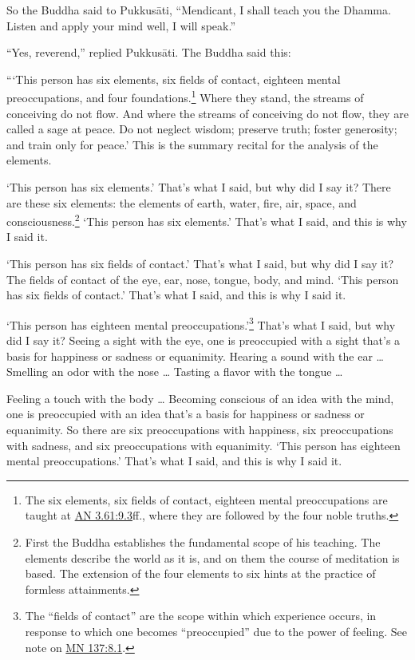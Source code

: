 \documentclass[12pt,openany]{book}%
\begin{document}
So the Buddha said to \textsanskrit{Pukkusāti}, “Mendicant, I shall teach you the Dhamma. Listen and apply your mind well, I will speak.” 

“Yes, reverend,” replied \textsanskrit{Pukkusāti}. The Buddha said this: 

“‘This person has six elements, six fields of contact, eighteen mental preoccupations, and four foundations.\footnote{The six elements, six fields of contact, eighteen mental preoccupations are taught at \href{https://suttacentral.net/an3.61/en/sujato\#9.3}{AN 3.61:9.3}ff., where they are followed by the four noble truths. } Where they stand, the streams of conceiving do not flow. And where the streams of conceiving do not flow, they are called a sage at peace. Do not neglect wisdom; preserve truth; foster generosity; and train only for peace.’ This is the summary recital for the analysis of the elements. 

‘This person has six elements.’ That’s what I said, but why did I say it? There are these six elements: the elements of earth, water, fire, air, space, and consciousness.\footnote{First the Buddha establishes the fundamental scope of his teaching. The elements describe the world as it is, and on them the course of meditation is based. The extension of the four elements to six hints at the practice of formless attainments. } ‘This person has six elements.’ That’s what I said, and this is why I said it. 

‘This person has six fields of contact.’ That’s what I said, but why did I say it? The fields of contact of the eye, ear, nose, tongue, body, and mind. ‘This person has six fields of contact.’ That’s what I said, and this is why I said it. 

‘This person has eighteen mental preoccupations.’\footnote{The “fields of contact” are the scope within which experience occurs, in response to which one becomes “preoccupied” due to the power of feeling. See note on \href{https://suttacentral.net/mn137/en/sujato\#8.1}{MN 137:8.1}. } That’s what I said, but why did I say it? Seeing a sight with the eye, one is preoccupied with a sight that’s a basis for happiness or sadness or equanimity. Hearing a sound with the ear … Smelling an odor with the nose … Tasting a flavor with the tongue … 

Feeling a touch with the body … Becoming conscious of an idea with the mind, one is preoccupied with an idea that’s a basis for happiness or sadness or equanimity. So there are six preoccupations with happiness, six preoccupations with sadness, and six preoccupations with equanimity. ‘This person has eighteen mental preoccupations.’ That’s what I said, and this is why I said it. 
\end{document}
